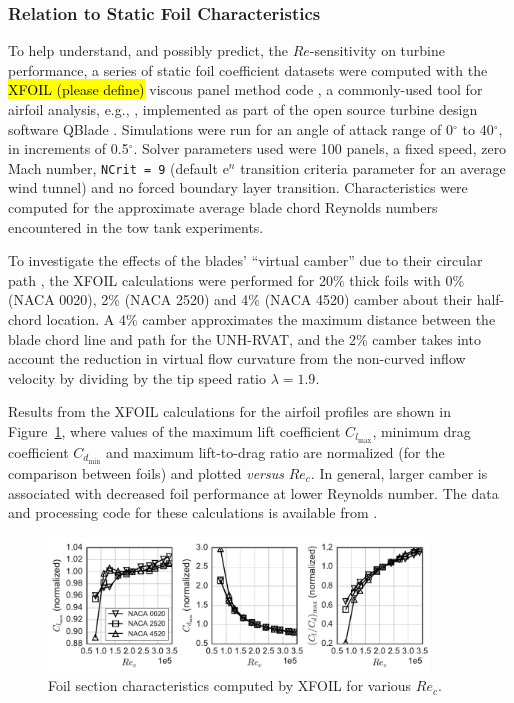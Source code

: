 \documentclass[energies,article,accept,moreauthors,pdftex,10pt,a4paper]{mdpi}
\theoremstyle{mdpi}
\newcounter{ex}
\newcounter{re}
\begin{document}
\subsubsection{Relation to Static Foil Characteristics}

To help understand, and possibly predict, the $Re$-sensitivity on turbine
performance, a series of static foil coefficient datasets were computed with the
\hl {XFOIL (please define)} viscous panel method code \cite{Drela1989}, a commonly-used tool for
airfoil analysis, e.g., \cite{Castelli2011, Walker2014}, implemented as part of
the open source turbine design software QBlade \cite{Marten2013}. Simulations
were run for an angle of attack range of 0$^{\circ}$
 to 40$^{\circ}$, in increments of 0.5$^{\circ}$. Solver parameters used were 100 panels, a fixed speed, zero Mach
number, \texttt{NCrit = 9} %
 (default $\mathrm{e}^n$ transition criteria parameter
for an average wind tunnel) and no forced boundary layer transition.
Characteristics were computed for the approximate average blade chord Reynolds
numbers encountered in the tow tank experiments.

To investigate the effects of the blades' ``virtual camber'' due to their
circular path \cite{Migliore1980}, the XFOIL calculations were performed for
20\% thick foils with 0\% (NACA 0020), 2\% (NACA 2520) and 4\% (NACA 4520)
camber about their half-chord location. A 4\% camber approximates the maximum
distance between the blade chord line and path for the UNH-RVAT, and the 2\%
camber takes into account the reduction in virtual flow curvature from the
non-curved inflow velocity by dividing by the tip speed ratio $\lambda=1.9$.

Results from the XFOIL calculations for the airfoil profiles are shown in
Figure~\ref{fig:foil-Re-dep}, where values of the maximum lift coefficient
$C_{l_{\max}}$, minimum drag coefficient $C_{d_{\min}}$ and maximum
lift-to-drag ratio are normalized (for the comparison between foils) and plotted
\textit{versus} $Re_c$. In general, larger camber is associated with decreased foil
performance at lower Reynolds number. The data and processing code for these
calculations is available from \cite{Bachant2015-NACAXX20-XFOIL}.

\begin{figure}[H]
\centering
\includegraphics[width=0.9\textwidth]{figures/all_foils_re_dep}
\caption{Foil section characteristics computed by XFOIL for various $Re_c$.}
\label{fig:foil-Re-dep}
\end{figure}
\end{document}
